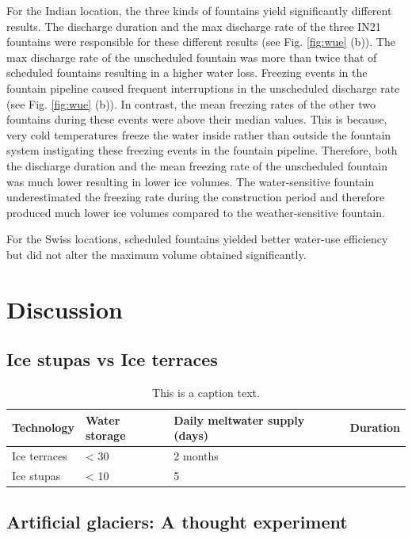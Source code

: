 For the Indian location, the three kinds of fountains yield significantly different results.  The discharge
duration and the max discharge rate of the three IN21 fountains were responsible for these different results
(see Fig. \ref{fig:wue} (b)). The max discharge rate of the unscheduled fountain was more than twice that of
scheduled fountains resulting in a higher water loss. Freezing events in the fountain pipeline caused frequent
interruptions in the unscheduled discharge rate (see Fig. \ref{fig:wue} (b)). In contrast, the mean freezing
rates of the other two fountains during these events were above their median values. This is because, very cold
temperatures freeze the water inside rather than outside the fountain system instigating these freezing events in
the fountain pipeline. Therefore, both the discharge duration and the mean freezing rate of the unscheduled
fountain was much lower resulting in lower ice volumes. The water-sensitive fountain underestimated the freezing
rate during the construction period and therefore produced much lower ice volumes compared to the
weather-sensitive fountain. 

For the Swiss locations, scheduled fountains yielded better water-use efficiency but did not alter the maximum
volume obtained significantly. 


\section{Discussion}
\subsection{Ice stupas vs Ice terraces}

\begin{table}[htb]
	\begin{tabularx}{\textwidth}{X | X | X | X}
		\hline
    \textbf{Technology}& \textbf{Water storage}& \textbf{Daily meltwater supply (days)}& \textbf{Duration} \\
    \hline
		Ice terraces			& < 30				     & 2 months				\\
    Ice stupas        & < 10             & 5				\\
		\hline
	\end{tabularx}
	\label{tab:table1}
	\caption{This is a caption text.}
\end{table}

\subsection{Artificial glaciers: A thought experiment}


